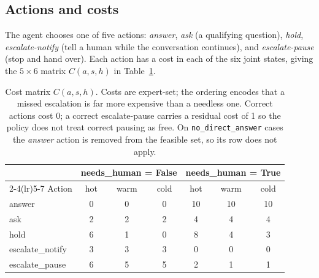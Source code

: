 \documentclass{article}
\begin{document}
\subsection{Actions and costs}
The agent chooses one of five actions: \emph{answer}, \emph{ask} (a qualifying
question), \emph{hold}, \emph{escalate-notify} (tell a human while the
conversation continues), and \emph{escalate-pause} (stop and hand over). Each
action has a cost in each of the six joint states, giving the $5 \times 6$
matrix $C(a, s, h)$ in Table~\ref{tab:costs}.

\begin{table}[t]
\centering
\setlength{\tabcolsep}{4pt}
\small
\begin{tabular}{lcccccc}
\toprule
& \multicolumn{3}{c}{needs\_human = False} & \multicolumn{3}{c}{needs\_human = True} \\
\cmidrule(lr){2-4}\cmidrule(lr){5-7}
Action & hot & warm & cold & hot & warm & cold \\
\midrule
answer           & 0 & 0 & 0 & 10 & 10 & 10 \\
ask              & 2 & 2 & 2 & 4  & 4  & 4  \\
hold             & 6 & 1 & 0 & 8  & 4  & 3  \\
escalate\_notify & 3 & 3 & 3 & 0  & 0  & 0  \\
escalate\_pause  & 6 & 5 & 5 & 2  & 1  & 1  \\
\bottomrule
\end{tabular}
\caption{Cost matrix $C(a,s,h)$. Costs are expert-set; the ordering encodes
that a missed escalation is far more expensive than a needless one. Correct
actions cost 0; a correct escalate-pause carries a residual cost of 1 so the
policy does not treat correct pausing as free. On \texttt{no\_direct\_answer}
cases the \emph{answer} action is removed from the feasible set, so its row
does not apply.}
\label{tab:costs}
\end{table}
\end{document}
